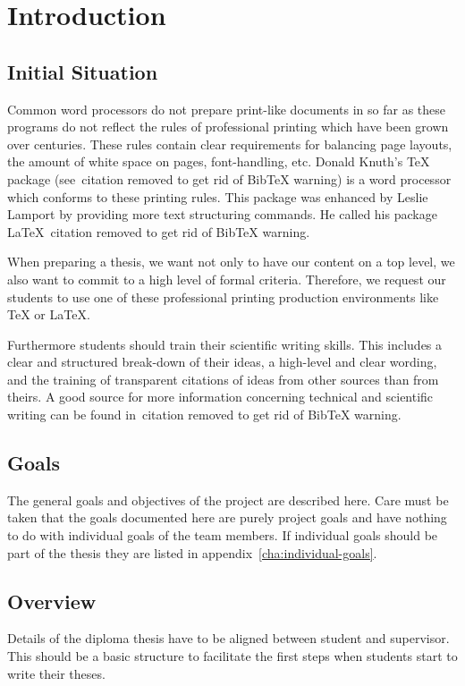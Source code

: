 \chapter{Introduction}
\section{Initial Situation}
Common word processors do not prepare print-like documents in so far as these programs do not reflect the rules of professional printing which have been grown over centuries. These rules contain clear requirements for balancing page layouts, the amount of white space on pages, font-handling, etc. Donald Knuth's TeX package (see~citation removed to get rid of BibTeX warning) is a word processor which conforms to these printing rules. This package was enhanced by Leslie Lamport by providing more text structuring commands. He called his package LaTeX~citation removed to get rid of BibTeX warning.

When preparing a thesis, we want not only to have our content on a top level, we also want to commit to a high level of formal criteria. Therefore, we request our students to use one of these professional printing production environments like TeX or LaTeX.

Furthermore students should train their scientific writing skills. This includes a clear and structured break-down of their ideas, a high-level and clear wording, and the training of transparent citations of ideas from other sources than from theirs. A good source for more information concerning technical and scientific writing can be found in~citation removed to get rid of BibTeX warning.

\section{Goals}
The general goals and objectives of the project are described here. Care must be taken that the goals documented here are purely project goals and have nothing to do with individual goals of the team members. If individual goals should be part of the thesis they are listed in appendix~\ref{cha:individual-goals}.

\section{Overview}
Details of the diploma thesis have to be aligned between student and supervisor. This should be a basic structure to facilitate the first steps when students start to write their theses.


